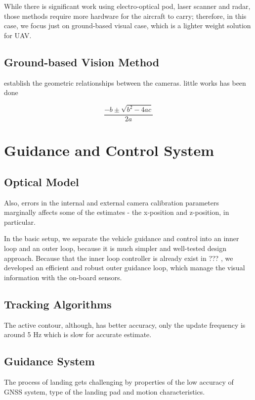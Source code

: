 While there is significant work using electro-optical pod, laser scanner and radar, those methods require more hardware for the aircraft to carry; therefore, in this case, we focus just on ground-based visual case, which is a lighter weight solution for UAV.


\subsection{Ground-based Vision Method}
 establish the geometric relationships between the  cameras.
little works has been done 

\[\frac{{ - b \pm \sqrt {{b^2} - 4ac} }}{{2a}}\]



\section{Guidance and Control System}

\subsection{Optical Model}

Also, errors in the internal and external camera calibration parameters marginally affects some of the estimates - the x-position and z-position, in particular.

In the basic setup, we separate the vehicle guidance and control into an inner loop and an outer loop, because it is much simpler and well-tested design approach. Because that the inner loop controller is already exist in ??? , we developed an efficient and robust outer guidance loop, which manage the visual information with the on-board sensors.

\subsection{Tracking Algorithms}

The active contour, although, has better accuracy, only the update frequency is around 5 Hz which is slow for accurate estimate.


\subsection{Guidance System}
The process of landing gets challenging by properties of the low accuracy of GNSS system, type of the landing pad and motion characteristics. 

